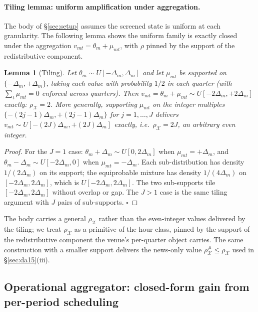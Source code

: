 \documentclass[11pt,a4paper]{article}
\newtheorem{lemma}{Lemma}
\theoremstyle{definition}
\theoremstyle{remark}
\theoremstyle{plain}
\begin{document}
\paragraph{Tiling lemma: uniform amplification under aggregation.} The body of \S\ref{sec:setup} assumes the screened state is uniform at each granularity. The following lemma shows the uniform family is exactly closed under the aggregation $v_{mt} = \theta_m + \mu_{mt}$, with $\rho$ pinned by the support of the redistributive component.

\begin{lemma}[Tiling]\label{lem:tiling}
Let $\theta_m \sim U[-\Delta_m, \Delta_m]$ and let $\mu_{mt}$ be supported on $\{-\Delta_m, +\Delta_m\}$, taking each value with probability $1/2$ in each quarter (with $\sum_t \mu_{mt} = 0$ enforced across quarters). Then $v_{mt} = \theta_m + \mu_{mt} \sim U[-2\Delta_m, +2\Delta_m]$ exactly: $\rho_{\mathcal X} = 2$. More generally, supporting $\mu_{mt}$ on the integer multiples $\{-(2j-1)\Delta_m, +(2j-1)\Delta_m\}$ for $j = 1, \dots, J$ delivers $v_{mt} \sim U[-(2J)\Delta_m, +(2J)\Delta_m]$ exactly, i.e.\ $\rho_{\mathcal X} = 2J$, an arbitrary even integer.
\end{lemma}

\begin{proof}
For the $J = 1$ case: $\theta_m + \Delta_m \sim U[0, 2\Delta_m]$ when $\mu_{mt} = +\Delta_m$, and $\theta_m - \Delta_m \sim U[-2\Delta_m, 0]$ when $\mu_{mt} = -\Delta_m$. Each sub-distribution has density $1/(2\Delta_m)$ on its support; the equiprobable mixture has density $1/(4\Delta_m)$ on $[-2\Delta_m, 2\Delta_m]$, which is $U[-2\Delta_m, 2\Delta_m]$. The two sub-supports tile $[-2\Delta_m, 2\Delta_m]$ without overlap or gap. The $J > 1$ case is the same tiling argument with $J$ pairs of sub-supports. $\square$
\end{proof}

The body carries a general $\rho_{\mathcal X}$ rather than the even-integer values delivered by the tiling; we treat $\rho_{\mathcal X}$ as a primitive of the hour class, pinned by the support of the redistributive component the venue's per-quarter object carries. The same construction with a smaller support delivers the news-only value $\rho^{\,\mu}_{\mathcal X} \le \rho_{\mathcal X}$ used in \S\ref{sec:da15}(iii).

\subsection{Operational aggregator: closed-form gain from per-period scheduling}\label{sec:aggregator-app}
\end{document}
